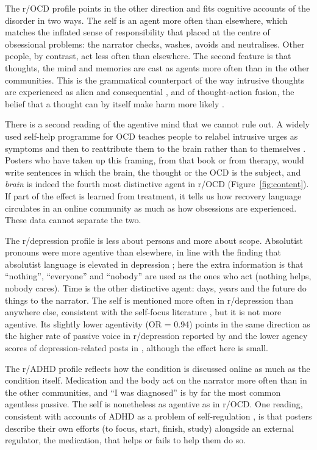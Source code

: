 \documentclass[11pt,a4paper]{article}
\begin{document}
The r/OCD profile points in the other direction and fits cognitive accounts of the disorder in two ways. The self is an agent more often than elsewhere, which matches the inflated sense of responsibility that \citet{salkovskis1985} placed at the centre of obsessional problems: the narrator checks, washes, avoids and neutralises. Other people, by contrast, act less often than elsewhere. The second feature is that thoughts, the mind and memories are cast as agents more often than in the other communities. This is the grammatical counterpart of the way intrusive thoughts are experienced as alien and consequential \citep{rachman1997}, and of thought-action fusion, the belief that a thought can by itself make harm more likely \citep{shafran1996}.

There is a second reading of the agentive mind that we cannot rule out. A widely used self-help programme for OCD teaches people to relabel intrusive urges as symptoms and then to reattribute them to the brain rather than to themselves \citep{schwartz1996}. Posters who have taken up this framing, from that book or from therapy, would write sentences in which the brain, the thought or the OCD is the subject, and \textit{brain} is indeed the fourth most distinctive agent in r/OCD (Figure~\ref{fig:content}). If part of the effect is learned from treatment, it tells us how recovery language circulates in an online community as much as how obsessions are experienced. These data cannot separate the two.

The r/depression profile is less about persons and more about scope. Absolutist pronouns were more agentive than elsewhere, in line with the finding that absolutist language is elevated in depression \citep{almosaiwi2018}; here the extra information is that ``nothing'', ``everyone'' and ``nobody'' are used as the ones who act (nothing helps, nobody cares). Time is the other distinctive agent: days, years and the future do things to the narrator. The self is mentioned more often in r/depression than anywhere else, consistent with the self-focus literature \citep{rude2004,tackman2019}, but it is not more agentive. Its slightly lower agentivity (OR = 0.94) points in the same direction as the higher rate of passive voice in r/depression reported by \citet{simchon2023} and the lower agency scores of depression-related posts in \citet{witkowska2026}, although the effect here is small.

The r/ADHD profile reflects how the condition is discussed online as much as the condition itself. Medication and the body act on the narrator more often than in the other communities, and ``I was diagnosed'' is by far the most common agentless passive. The self is nonetheless as agentive as in r/OCD. One reading, consistent with accounts of ADHD as a problem of self-regulation \citep{barkley1997}, is that posters describe their own efforts (to focus, start, finish, study) alongside an external regulator, the medication, that helps or fails to help them do so.
\end{document}

